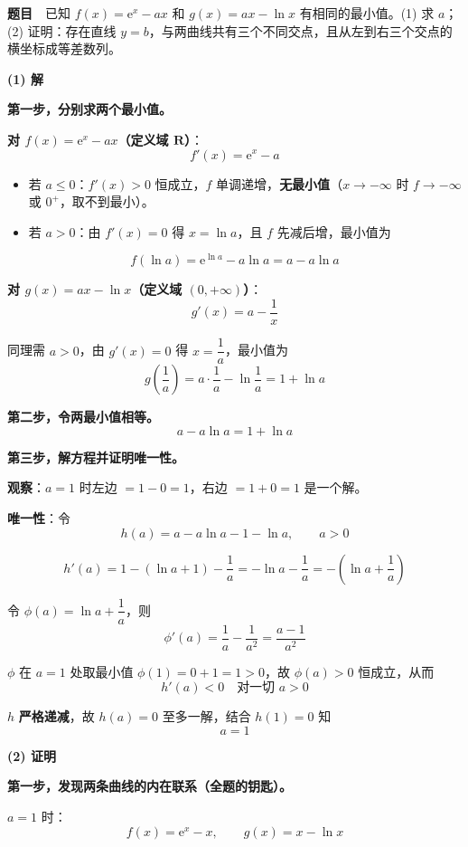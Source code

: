 
\textbf{题目}　已知 $f(x)=\mathrm e^{x}-ax$ 和 $g(x)=ax-\ln x$ 有相同的最小值。(1) 求 $a$；(2) 证明：存在直线 $y=b$，与两曲线共有三个不同交点，且从左到右三个交点的横坐标成等差数列。

\par\medskip

\textbf{(1) 解}

\textbf{第一步，分别求两个最小值。}

\textbf{对 $f(x)=\mathrm e^{x}-ax$（定义域 $\mathbf R$）}：
\[f'(x)=\mathrm e^{x}-a\]

\begin{itemize}
\item 若 $a\le0$：$f'(x)>0$ 恒成立，$f$ 单调递增，\textbf{无最小值}（$x\to-\infty$ 时 $f\to-\infty$ 或 $0^{+}$，取不到最小）。
\item 若 $a>0$：由 $f'(x)=0$ 得 $x=\ln a$，且 $f$ 先减后增，最小值为
\end{itemize}
\[f(\ln a)=\mathrm e^{\ln a}-a\ln a=a-a\ln a\]

\textbf{对 $g(x)=ax-\ln x$（定义域 $(0,+\infty)$）}：
\[g'(x)=a-\frac1x\]

同理需 $a>0$，由 $g'(x)=0$ 得 $x=\dfrac1a$，最小值为
\[g\left(\frac1a\right)=a\cdot\frac1a-\ln\frac1a=1+\ln a\]

\textbf{第二步，令两最小值相等。}
\[a-a\ln a=1+\ln a\]

\textbf{第三步，解方程并证明唯一性。}

\textbf{观察}：$a=1$ 时左边 $=1-0=1$，右边 $=1+0=1$  是一个解。

\textbf{唯一性}：令
\[h(a)=a-a\ln a-1-\ln a,\qquad a>0\]

\[h'(a)=1-\left(\ln a+1\right)-\frac1a=-\ln a-\frac1a=-\left(\ln a+\frac1a\right)\]

令 $\phi(a)=\ln a+\dfrac1a$，则
\[\phi'(a)=\frac1a-\frac1{a^{2}}=\frac{a-1}{a^{2}}\]

$\phi$ 在 $a=1$ 处取最小值 $\phi(1)=0+1=1>0$，故 $\phi(a)>0$ 恒成立，从而
\[h'(a)<0\quad\text{对一切 }a>0\]

$h$ \textbf{严格递减}，故 $h(a)=0$ 至多一解，结合 $h(1)=0$ 知
\[a=1\]


\par\medskip

\textbf{(2) 证明}

\textbf{第一步，发现两条曲线的内在联系（全题的钥匙）。}

$a=1$ 时：
\[f(x)=\mathrm e^{x}-x,\qquad g(x)=x-\ln x\]

